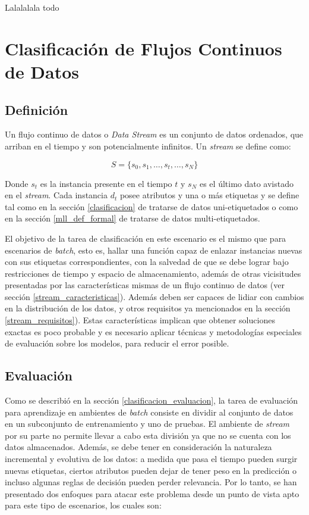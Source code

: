 Lalalalala todo

\section{Clasificación de Flujos Continuos de Datos}

\subsection{Definición}

Un flujo continuo de datos o \textit{Data Stream} es un conjunto de datos
ordenados, que arriban en el tiempo y son potencialmente infinitos. Un
\textit{stream} se define como:

\begin{equation}
   S = \{s_{0}, s_{1}, \dots, s_{t}, \dots, s_{N}\}
\end{equation}

Donde $s_{t}$ es la instancia presente en el tiempo $t$ y $s_{N}$ es el
último dato avistado en el \textit{stream}. Cada instancia $d_{t}$ posee
atributos y una o más etiquetas y se define tal como en la sección
\ref{clasificacion} de tratarse de datos uni-etiquetados o como en la sección
\ref{mll_def_formal} de tratarse de datos multi-etiquetados. 

El objetivo de la tarea de clasificación en este escenario es el mismo que para
escenarios de \textit{batch}, esto es, hallar una función capaz de enlazar
instancias nuevas con sus etiquetas correspondientes, con la salvedad de que se
debe lograr bajo restricciones de tiempo y espacio de almacenamiento, además de
otras vicisitudes presentadas por las características mismas de un flujo
continuo de datos (ver sección \ref{stream_caracteristicas}). Además deben ser
capaces de lidiar con cambios en la distribución de los datos, y otros
requisitos ya mencionados en la sección \ref{stream_requisitos}). Estas
características implican que obtener soluciones exactas es poco probable y es
necesario aplicar técnicas y metodologías especiales de evaluación sobre los
modelos, para reducir el error posible.


\subsection{Evaluación}

Como se describió en la sección \ref{clasificacion_evaluacion}, la tarea de
evaluación para aprendizaje en ambientes de \textit{batch} consiste en dividir
al conjunto de datos en un subconjunto de entrenamiento y uno de pruebas. El
ambiente de \textit{stream} por su parte no permite llevar a cabo esta división
ya que no se cuenta con los datos almacenados. Además, se debe tener en
consideración la naturaleza incremental y evolutiva de los datos: a medida que
pasa el tiempo pueden surgir nuevas etiquetas, ciertos atributos pueden dejar de
tener peso en la predicción o incluso algunas reglas de decisión pueden perder
relevancia. Por lo tanto, se han presentado dos enfoques para atacar este
problema desde un punto de vista apto para este tipo de escenarios, los cuales
son:

